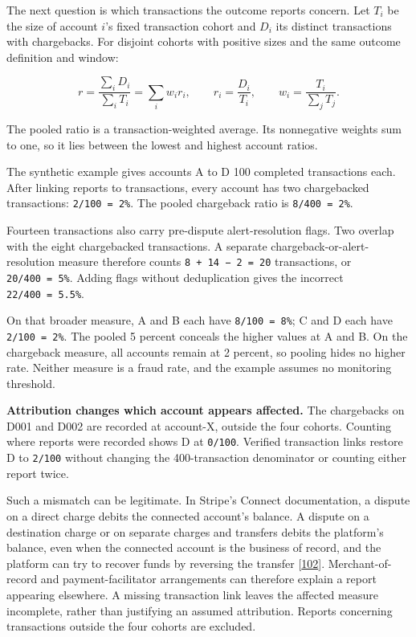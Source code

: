 \documentclass[
  11pt,
]{article}
\begin{document}
The next question is which transactions the outcome reports concern. Let
\(T_i\) be the size of account \(i\)'s fixed transaction cohort and
\(D_i\) its distinct transactions with chargebacks. For disjoint cohorts
with positive sizes and the same outcome definition and window:

\[
r = \frac{\sum_i D_i}{\sum_i T_i} = \sum_i w_i r_i,\qquad
r_i = \frac{D_i}{T_i},\qquad
w_i = \frac{T_i}{\sum_j T_j}.
\]

The pooled ratio is a transaction-weighted average. Its nonnegative
weights sum to one, so it lies between the lowest and highest account
ratios.

The synthetic example gives accounts A to D 100 completed transactions
each. After linking reports to transactions, every account has two
chargebacked transactions: \mbox{\texttt{2/100\ =\ 2\%}}. The pooled
chargeback ratio is \mbox{\texttt{8/400\ =\ 2\%}}.

Fourteen transactions also carry pre-dispute alert-resolution flags. Two
overlap with the eight chargebacked transactions. A separate
chargeback-or-alert-resolution measure therefore counts
\mbox{\texttt{8\ +\ 14\ −\ 2\ =\ 20}} transactions, or
\mbox{\texttt{20/400\ =\ 5\%}}. Adding flags without deduplication gives
the incorrect \mbox{\texttt{22/400\ =\ 5.5\%}}.

On that broader measure, A and B each have
\mbox{\texttt{8/100\ =\ 8\%}}; C and D each have
\mbox{\texttt{2/100\ =\ 2\%}}. The pooled 5 percent conceals the higher
values at A and B. On the chargeback measure, all accounts remain at 2
percent, so pooling hides no higher rate. Neither measure is a fraud
rate, and the example assumes no monitoring threshold.

\textbf{Attribution changes which account appears affected.} The
chargebacks on D001 and D002 are recorded at account-X, outside the four
cohorts. Counting where reports were recorded shows D at \texttt{0/100}.
Verified transaction links restore D to \texttt{2/100} without changing
the 400-transaction denominator or counting either report twice.

Such a mismatch can be legitimate. In Stripe's Connect documentation, a
dispute on a direct charge debits the connected account's balance. A
dispute on a destination charge or on separate charges and transfers
debits the platform's balance, even when the connected account is the
business of record, and the platform can try to recover funds by
reversing the transfer
{[}\protect\hyperlink{ref-Stripe2026ConnectCharges}{102}{]}.
Merchant-of-record and payment-facilitator arrangements can therefore
explain a report appearing elsewhere. A missing transaction link leaves
the affected measure incomplete, rather than justifying an assumed
attribution. Reports concerning transactions outside the four cohorts
are excluded.
\end{document}
